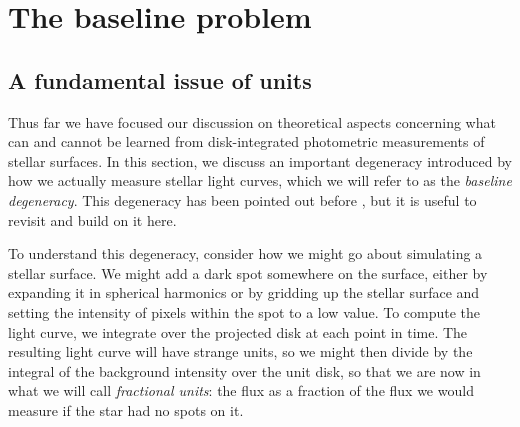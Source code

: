 \documentclass[modern]{aastex62}
\begin{document}
\section{The baseline problem}
\label{sec:baseline}

\subsection{A fundamental issue of units}

Thus far we have focused our discussion on theoretical aspects concerning
what can and cannot be learned from disk-integrated photometric measurements
of stellar surfaces. In this section, we discuss an important degeneracy
introduced by how we actually measure stellar light curves, which we
will refer to as the \emph{baseline degeneracy}. This degeneracy has been
pointed out before \citep[e.g.,][]{Basri2018}, but it is useful to revisit and
build on it here.

To understand this degeneracy, consider how we might go about simulating
a stellar surface.
%
We might add a dark spot somewhere on the surface, either by expanding
it in spherical harmonics or by gridding up the stellar surface and
setting the intensity of pixels within the spot to a low value. To compute
the light curve, we integrate over the
projected disk at each point in time.
The resulting
light curve will have strange units, so we might then divide by the
integral of the background intensity over the unit disk, so that we are
now in what we will call \emph{fractional units}: the flux as a
fraction of the flux we would measure if the star had no spots on it.
\end{document}
